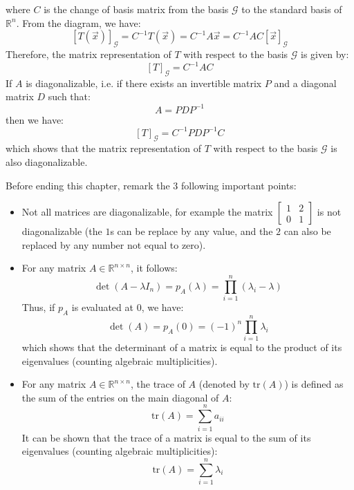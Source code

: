 \begin{eg}
\begin{center}
    \end{center}
    where $C$ is the change of basis matrix from the basis $\mathcal{G}$ to the standard basis of $\mathbb{R}^n$. From the diagram, we have:
    \[[T(\vec{x})]_{\mathcal{G}} = C^{-1} T(\vec{x}) = C^{-1} A \vec{x} = C^{-1} A C [\vec{x}]_{\mathcal{G}}\]
    Therefore, the matrix representation of $T$ with respect to the basis $\mathcal{G}$ is given by:
    \[[T]_{\mathcal{G}} = C^{-1} A C\]
    If $A$ is diagonalizable, i.e. if there exists an invertible matrix $P$ and a diagonal matrix $D$ such that:
    \[A = P D P^{-1}\]
    then we have:
    \[[T]_{\mathcal{G}} = C^{-1} P D P^{-1} C\]
    which shows that the matrix representation of $T$ with respect to the basis $\mathcal{G}$ is also diagonalizable.
\end{eg}
Before ending this chapter, remark the 3 following important points:
\begin{itemize}[itemsep=1pt,label=$\circ$]
    \item Not all matrices are diagonalizable, for example the matrix $\begin{bmatrix}
            1 & 2 \\ 0 & 1
        \end{bmatrix}$ is not diagonalizable (the $1$s can be replace by any value, and the $2$ can also be replaced by any number not equal to zero).
    \item For any matrix $A \in \mathbb{R}^{n \times n}$, it follows:
        \[
            \det(A - \lambda I_n) = p_A(\lambda) = \prod_{i=1}^n (\lambda_i - \lambda)
        \]
        Thus, if $p_A$ is evaluated at $0$, we have:
        \[\det(A) = p_A(0) = (-1)^n \prod_{i=1}^n \lambda_i\]
        which shows that the determinant of a matrix is equal to the product of its eigenvalues (counting algebraic multiplicities).
    \item For any matrix $A \in \mathbb{R}^{n \times n}$, the trace of $A$ (denoted by $\text{tr}(A)$) is defined as the sum of the entries on the main diagonal of $A$:
        \[\text{tr}(A) = \sum_{i=1}^n a_{ii}\]
        It can be shown that the trace of a matrix is equal to the sum of its eigenvalues (counting algebraic multiplicities):
        \[\text{tr}(A) = \sum_{i=1}^n \lambda_i\]
\end{itemize}